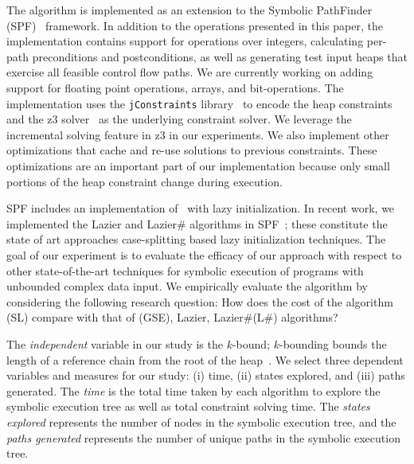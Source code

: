 
The \symtxt{} algorithm is implemented as an extension to the Symbolic
PathFinder (SPF)~\cite{DBLP:journals/ase/PasareanuVBGMR13}
framework. In addition to the operations presented in this paper, the
implementation contains support for operations over integers,
calculating per-path preconditions and postconditions, as well as
generating test input heaps that exercise all feasible control flow
paths. We are currently working on adding support for floating point
operations, arrays, and bit-operations. The \symtxt{} implementation
uses the \texttt{jConstraints}
library~\cite{ase2014-ghilrr,jpf2014-dghirr} to encode the heap
constraints and the z3 solver~\cite{deMouraBjorner08Z3} as the
underlying constraint solver. We leverage the incremental solving
feature in z3 in our experiments. We also implement other
optimizations that cache and re-use solutions to previous
constraints. These optimizations are an important part of our
implementation because only small portions of the heap constraint
change during execution.

SPF includes an implementation of~\gsetxt{} with lazy initialization.
In recent work, we implemented the Lazier and Lazier\# algorithms in
SPF~\cite{Hillery:2014}; these constitute the state of art approaches
case-splitting based lazy initialization techniques. The goal of our
experiment is to evaluate the efficacy of our approach with respect to
other state-of-the-art techniques for symbolic execution of programs
with unbounded complex data input. We empirically evaluate the
\symtxt{} algorithm by considering the following research question:
How does the cost of the \symtxt{} algorithm (SL) compare with that of
\gsetxt{} (GSE), Lazier, Lazier\#(L\#) algorithms?

The \emph{independent} variable in our study is the $k$-bound;
$k$-bounding bounds the length of a reference chain from the root of
the heap~\cite{Kiasan06}.  We select three dependent variables and
measures for our study: (i) time, (ii) states explored, and (iii)
paths generated. The \emph{time} is the total time taken by each
algorithm to explore the symbolic execution tree as well as total
constraint solving time. The \emph{states explored} represents the
number of nodes in the symbolic execution tree, and the \emph{paths
  generated} represents the number of unique paths in the symbolic
execution tree.

